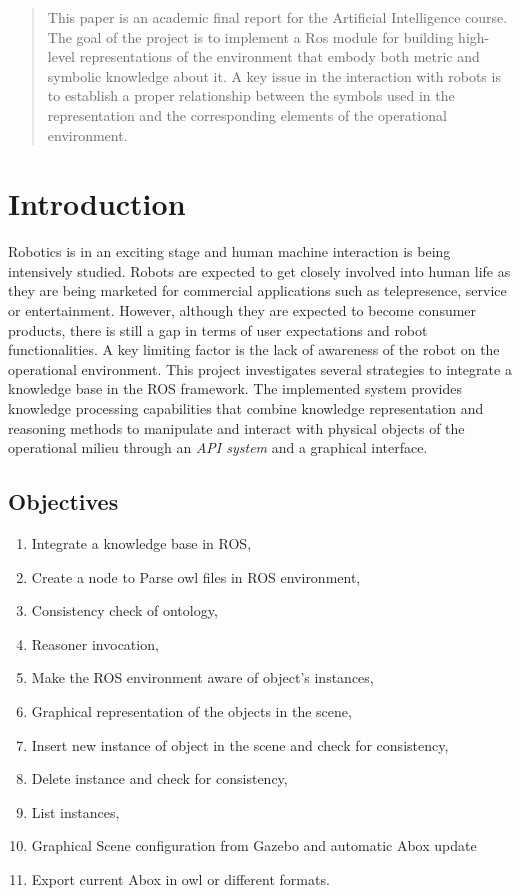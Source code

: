 \begin{abstract}
This paper is an academic final report for the Artificial Intelligence course. The goal of the project is to implement a Ros module for building high-level representations of the environment that embody both metric and symbolic knowledge about it. A key issue in the interaction with robots is to establish a proper relationship between the symbols used in the representation and the corresponding elements of the operational environment.
\end{abstract}	

\section{Introduction}

Robotics is in an exciting stage and human machine interaction is being intensively studied.
Robots are expected to get closely involved into human life as they are being marketed for commercial applications such as telepresence, service or entertainment. However, although they are expected to become consumer products, there is still a gap in terms of user expectations and robot functionalities. A key limiting factor is the lack of awareness of the robot on the operational environment.
This project investigates several strategies to integrate a knowledge base in the ROS framework. The implemented system provides knowledge processing capabilities that combine knowledge representation and reasoning methods to manipulate and interact with physical objects of the operational milieu through an \textit{API system} and a graphical interface.\\

\subsection{Objectives}
\label{sec:objectives}

\begin{enumerate}
\item Integrate a knowledge base in ROS,
\item Create a node to Parse owl files in ROS environment,
\item Consistency check of ontology,
\item Reasoner invocation,
\item Make the ROS environment aware of object's instances,
\item Graphical representation of the objects in the scene,
\item Insert new instance of object in the scene and check for consistency,
\item Delete instance and check for consistency,
\item List instances,
\item Graphical Scene configuration from Gazebo and automatic Abox update
\item Export current Abox in owl or different formats.
\end{enumerate}


